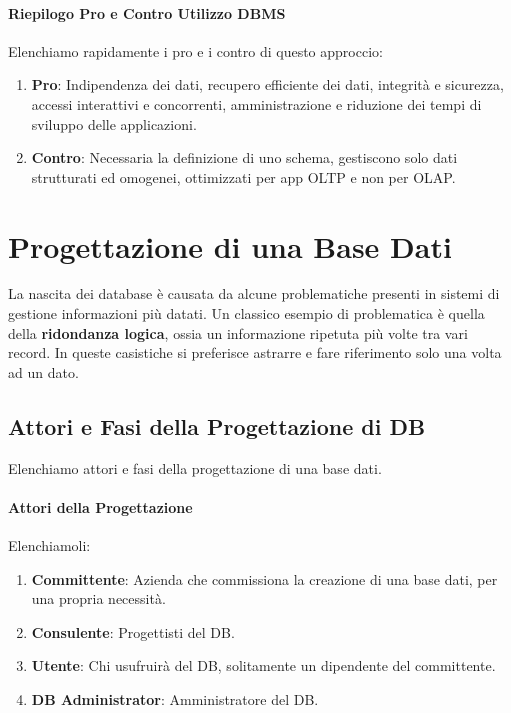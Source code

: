 \documentclass{article}
\begin{document}
\paragraph{Riepilogo Pro e Contro Utilizzo DBMS}

Elenchiamo rapidamente i pro e i contro di questo approccio:

\begin{enumerate}
    \item \textbf{Pro}: Indipendenza dei dati, recupero efficiente dei dati, integrità e sicurezza, accessi interattivi e concorrenti, amministrazione e riduzione dei tempi di
    sviluppo delle applicazioni.
    \item \textbf{Contro}: Necessaria la definizione di uno schema, gestiscono solo dati strutturati ed omogenei, ottimizzati per app OLTP e non per OLAP.
\end{enumerate}

\newpage

\section{Progettazione di una Base Dati}

La nascita dei database è causata da alcune problematiche presenti in sistemi di
gestione informazioni più datati. Un classico esempio di problematica è quella della
\textbf{ridondanza logica}, ossia un informazione ripetuta più volte tra vari record. In queste
casistiche si preferisce astrarre e fare riferimento solo una volta ad un dato.

\subsection{Attori e Fasi della Progettazione di DB}

Elenchiamo attori e fasi della progettazione di una base dati.

\paragraph{Attori della Progettazione} Elenchiamoli:

\begin{enumerate}
    \item \textbf{Committente}: Azienda che commissiona la creazione di una base dati, per una propria necessità.
    \item \textbf{Consulente}: Progettisti del DB.
    \item \textbf{Utente}: Chi usufruirà del DB, solitamente un dipendente del committente.
    \item \textbf{DB Administrator}: Amministratore del DB.
\end{enumerate}
\end{document}
